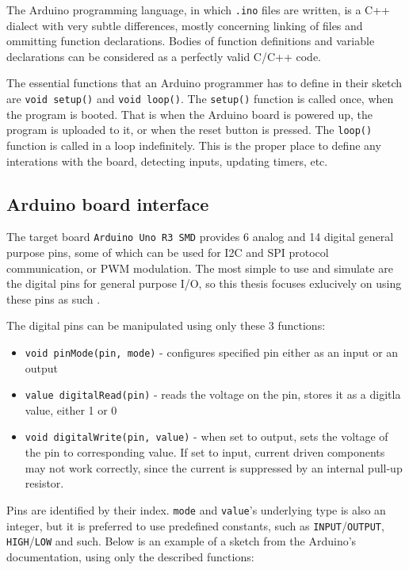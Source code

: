 The Arduino programming language, in which \texttt{.ino} files are written, is a C++ dialect with very subtle differences, mostly concerning linking of files and ommitting function declarations. Bodies of function definitions and variable declarations can be considered as a perfectly valid C/C++ code. 

The essential functions that an Arduino programmer has to define in their sketch are \texttt{void setup()} and \texttt{void loop()}. The \texttt{setup()} function is called once, when the program is booted. That is when the Arduino board is powered up, the program is uploaded to it, or when the reset button is pressed. The \texttt{loop()} function is called in a loop indefinitely. This is the proper place to define any interations with the board, detecting inputs, updating timers, etc.

\subsection{Arduino board interface}

The target board \texttt{Arduino Uno R3 SMD} provides 6 analog and 14 digital general purpose pins, some of which can be used for I2C and SPI protocol communication, or PWM modulation. The most simple to use and simulate are the digital pins for general purpose I/O, so this thesis focuses exlucively on using these pins as such \cite{arduino_r3_smd_specs}.

The digital pins can be manipulated using only these 3 functions:
\begin{itemize}
    \item \texttt{void pinMode(pin, mode)} - configures specified pin either as an input or an output
    \item \texttt{value digitalRead(pin)} - reads the voltage on the pin, stores it as a digitla value, either 1 or 0
    \item \texttt{void digitalWrite(pin, value)} - when set to output, sets the voltage of the pin to corresponding value. If set to input, current driven components may not work correctly, since the current is suppressed by an internal pull-up resistor. 
\end{itemize}

Pins are identified by their index. \texttt{mode} and \texttt{value}'s underlying type is also an integer, but it is preferred to use predefined constants, such as \texttt{INPUT}/\texttt{OUTPUT}, \texttt{HIGH}/\texttt{LOW} and such. Below is an example of a sketch from the Arduino's documentation, using only the described functions:

